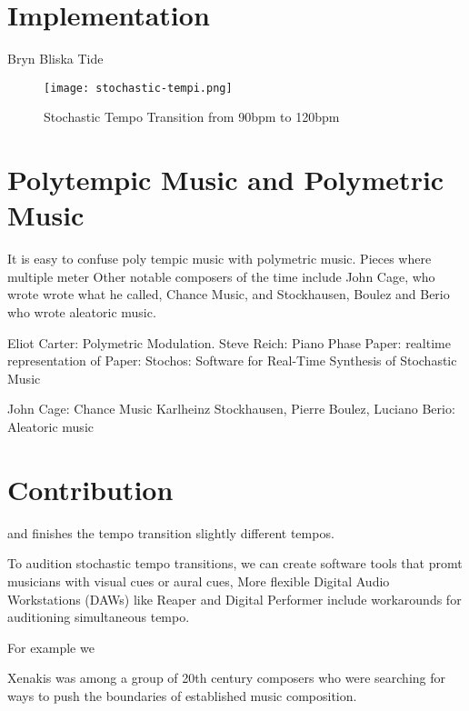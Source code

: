 \section{Implementation}
\label{sec:polytempic-implementation}

Bryn Bliska Tide

\begin{figure*}[h]
  \texttt{[image: stochastic-tempi.png]}
  \caption{Stochastic Tempo Transition from 90bpm to 120bpm}
  \label{fig:metastasis}
\end{figure*}


\section{Polytempic Music and Polymetric Music}
\label{sec:polytempic-vs-polymetric}
It is easy to confuse poly tempic music with polymetric music.  Pieces
where multiple meter
Other notable composers
of the time include John Cage, who wrote wrote what he called, Chance
Music, and Stockhausen, Boulez and Berio who wrote aleatoric music.



Eliot Carter: Polymetric Modulation. 
Steve Reich: Piano Phase
Paper: realtime representation of 
Paper: Stochos: Software for Real-Time Synthesis of Stochastic Music

John Cage: Chance Music
Karlheinz Stockhausen, Pierre Boulez, Luciano Berio: Aleatoric music

\section{Contribution}
\label{sec:polytempic-contribution}

and finishes the tempo transition slightly different tempos.

To audition stochastic tempo transitions, we can create software tools
that promt musicians with visual cues or aural cues, 
More flexible Digital Audio Workstations (DAWs) like Reaper and
Digital Performer include workarounds for auditioning simultaneous
tempo. 

For example we 

Xenakis was among a group of
20th century composers who were searching for ways to push the
boundaries of established music composition.



